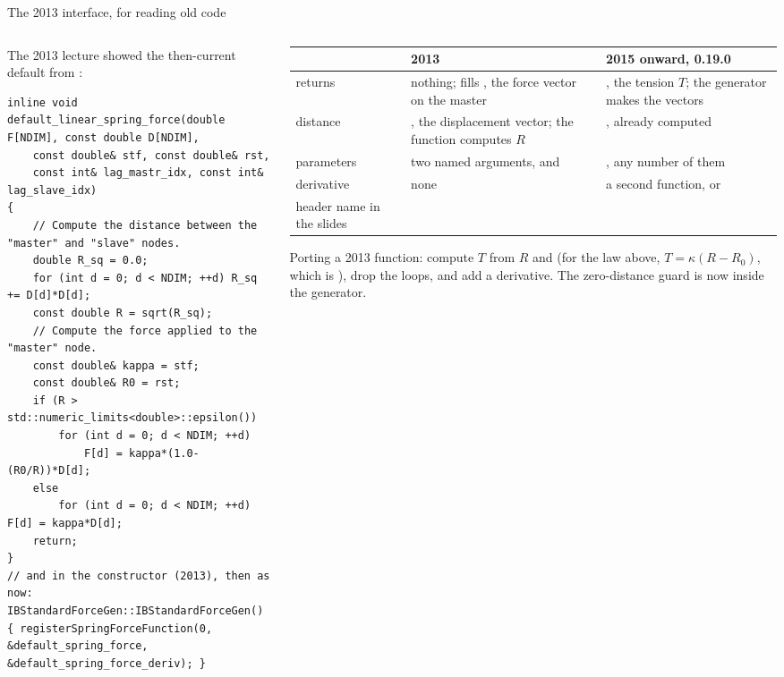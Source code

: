 \documentclass[aspectratio=169,11pt]{beamer}
\begin{document}
\begin{frame}[fragile]{The 2013 interface, for reading old code}
\label{fr:old}
\vspace{-1mm}
\begin{columns}[T,onlytextwidth]
\begin{column}{0.52\textwidth}
\footnotesize The 2013 lecture showed the then-current default from :
\begin{lstlisting}[style=cpptiny]
inline void
default_linear_spring_force(double F[NDIM], const double D[NDIM],
    const double& stf, const double& rst,
    const int& lag_mastr_idx, const int& lag_slave_idx)
{
    // Compute the distance between the "master" and "slave" nodes.
    double R_sq = 0.0;
    for (int d = 0; d < NDIM; ++d) R_sq += D[d]*D[d];
    const double R = sqrt(R_sq);
    // Compute the force applied to the "master" node.
    const double& kappa = stf;
    const double& R0 = rst;
    if (R > std::numeric_limits<double>::epsilon())
        for (int d = 0; d < NDIM; ++d)
            F[d] = kappa*(1.0-(R0/R))*D[d];
    else
        for (int d = 0; d < NDIM; ++d) F[d] = kappa*D[d];
    return;
}
// and in the constructor (2013), then as now:
IBStandardForceGen::IBStandardForceGen()
{ registerSpringForceFunction(0, &default_spring_force, &default_spring_force_deriv); }
\end{lstlisting}
\end{column}
\begin{column}{0.46\textwidth}
\scriptsize
\setlength{\tabcolsep}{3pt}
\begin{tabular}{@{}L{0.2\textwidth}L{0.36\textwidth}L{0.38\textwidth}@{}}
\toprule
 & 2013 & 2015 onward, 0.19.0\\
\midrule
returns & nothing; fills , the force vector on the master & , the tension $T$; the generator makes the vectors\\
distance & , the displacement vector; the function computes $R$ & , already computed\\
parameters & two named arguments,  and  & , any number of them\\
derivative & none & a second function, or \\
header name in the slides &  & \\
\bottomrule
\end{tabular}

\scriptsize Porting a 2013 function: compute $T$ from $R$ and  (for the law above, $T = \kappa(R - R_0)$, which is ), drop the loops, and add a derivative. The zero-distance guard is now inside the generator.
\end{column}
\end{columns}
\end{frame}
\end{document}
